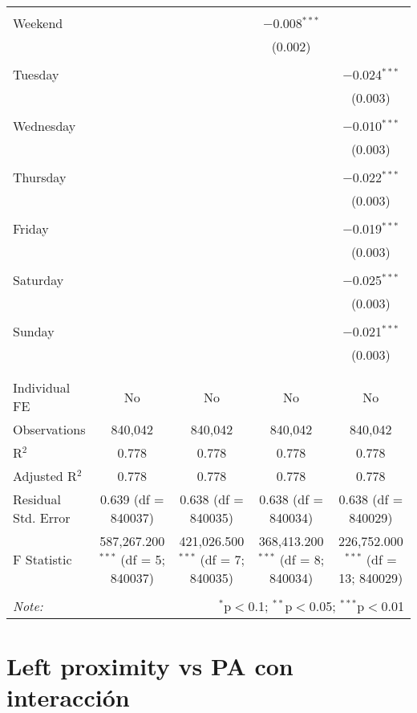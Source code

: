 \documentclass[
]{article}
\begin{document}
\begin{table}[!htbp]
{\begin{tabular}{@{\extracolsep{5pt}}lcccc}
  & & & & \\ 
 Weekend &  &  & $-$0.008$^{***}$ &  \\ 
  &  &  & (0.002) &  \\ 
  & & & & \\ 
 Tuesday &  &  &  & $-$0.024$^{***}$ \\ 
  &  &  &  & (0.003) \\ 
  & & & & \\ 
 Wednesday &  &  &  & $-$0.010$^{***}$ \\ 
  &  &  &  & (0.003) \\ 
  & & & & \\ 
 Thursday &  &  &  & $-$0.022$^{***}$ \\ 
  &  &  &  & (0.003) \\ 
  & & & & \\ 
 Friday &  &  &  & $-$0.019$^{***}$ \\ 
  &  &  &  & (0.003) \\ 
  & & & & \\ 
 Saturday &  &  &  & $-$0.025$^{***}$ \\ 
  &  &  &  & (0.003) \\ 
  & & & & \\ 
 Sunday &  &  &  & $-$0.021$^{***}$ \\ 
  &  &  &  & (0.003) \\ 
  & & & & \\ 
\hline \\[-1.8ex] 
Individual FE & No & No & No & No \\ 
Observations & 840,042 & 840,042 & 840,042 & 840,042 \\ 
R$^{2}$ & 0.778 & 0.778 & 0.778 & 0.778 \\ 
Adjusted R$^{2}$ & 0.778 & 0.778 & 0.778 & 0.778 \\ 
Residual Std. Error & 0.639 (df = 840037) & 0.638 (df = 840035) & 0.638 (df = 840034) & 0.638 (df = 840029) \\ 
F Statistic & 587,267.200$^{***}$ (df = 5; 840037) & 421,026.500$^{***}$ (df = 7; 840035) & 368,413.200$^{***}$ (df = 8; 840034) & 226,752.000$^{***}$ (df = 13; 840029) \\ 
\hline 
\hline \\[-1.8ex] 
\textit{Note:}  & \multicolumn{4}{r}{$^{*}$p$<$0.1; $^{**}$p$<$0.05; $^{***}$p$<$0.01} \\ 
\end{tabular}
} 
\end{table} 
\newpage
\section{Left proximity vs PA con interacción}
\end{document}
